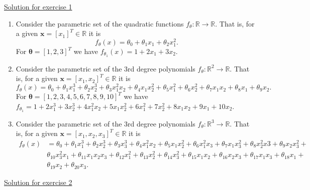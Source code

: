 \documentclass[12pt]{book}
\theoremstyle{definition}
\newcommand{\bb}[1]{\mathbb{#1}}
\newcommand{\R}{\bb{R}}
\begin{document}
{\underline{\large Solution for exercise 1}}
\vspace{0.1 cm}
\begin{enumerate}[label=(\alph*)]
	\item Consider the parametric set of the quadratic functions $f_\theta:\R \rightarrow \R$. That is, for a given $\bm{x} = [x_1]^T \in \R$ it is
	\begin{equation*}
	f_\theta(x) = \theta_0 + \theta_1x_1 + \theta_2x_1^2.
	\end{equation*}
	For $\bm{\theta} = [1,2,3]^T$ we have
	$f_{\theta{_1}}(x) = 1 + 2x_1 + 3x_2$.
	
	\item Consider the parametric set of the 3rd degree polynomials $f_\theta:\R^2 \rightarrow \R$. That is, for a given $\mathbf{x} = [x_1,x_2]^T \in \R$ it is
	\begin{equation*}
	f_\theta(x) = \theta_0 + \theta_1x_1^3 + \theta_2x_2^3 + \theta_3x_1^2x_2 + \theta_4x_1x_2^2 + \theta_5x_1^2 + \theta_6x_2^2 + \theta_7x_1x_2 + \theta_8x_1 + \theta_9x_2.
	\end{equation*}
	For $\bm{\theta} = [1,2,3,4,5,6,7,8,9,10]^T$ we have
	$f_{\theta{_1}} = 1 + 2x_1^3 + 3x_2^3 + 4x_1^2x_2 + 5x_1x_2^2 + 6x_1^2 + 7x_2^2 + 8x_1x_2 + 9x_1 + 10x_2$.
	
	\item Consider the parametric set of the 3rd degree polynomials $f_\theta:\R^3 \rightarrow \R$. That is, for a given $\bm{x} = [x_1,x_2,x_3]^T \in \R$ it is
	\begin{equation*}
	\begin{aligned}
	f_\theta(x) &= \theta_0 +
	 \theta_1x_1^3 +
	  \theta_2x_2^3 +
	   \theta_3x_3^3 +
	    \theta_4x_1^2x_2 +
	     \theta_5x_1x_2^2 +
	      \theta_6x_1^2x_3 +
	       \theta_7x_1x_3^2 +
	        \theta_8x_2^2x3 +
	         \theta_9x_2x_3^2 + \\
	          &\theta_{10}x_3^2x_1 +
	           \theta_{11}x_1x_2x_3 + 
	           \theta_{12}x_1^2 +
	           \theta_{13}x_2^2 +
	           \theta_{14}x_3^2 +
	           \theta_{15}x_1x_2 +
	           \theta_{16}x_2x_3 +
	           \theta_{17}x_1x_3 +
	           \theta_{18}x_1 + \\
	           &\theta_{19}x_2 +
	           \theta_{20}x_3.
	\end{aligned}
	\end{equation*}	
\end{enumerate}
\vspace{0.5 cm}
{\underline{\large Solution for exercise 2}}
\vspace{0.3 cm}
\end{document}
